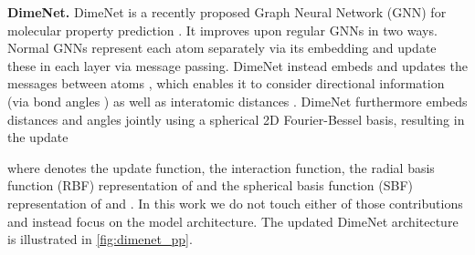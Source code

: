 \documentclass{article}
\begin{document}
\textbf{DimeNet.} DimeNet is a recently proposed Graph Neural Network (GNN) for molecular property prediction \cite{gasteiger_directional_2020}. It improves upon regular GNNs in two ways. Normal GNNs represent each atom  separately via its embedding  and update these in each layer  via message passing. DimeNet instead embeds and updates the messages between atoms , which enables it to consider directional information (via bond angles ) as well as interatomic distances . DimeNet furthermore embeds distances and angles jointly using a spherical 2D Fourier-Bessel basis, resulting in the update

where  denotes the update function,  the interaction function,  the radial basis function (RBF) representation of  and  the spherical basis function (SBF) representation of  and . In this work we do not touch either of those contributions and instead focus on the model architecture. The updated DimeNet architecture is illustrated in \cref{fig:dimenet_pp}.
\end{document}
